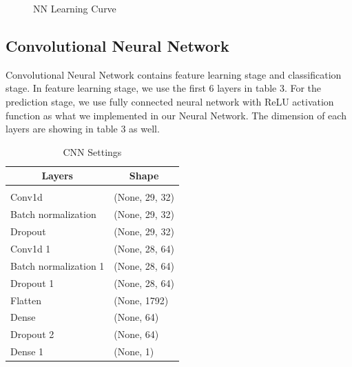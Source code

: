 \documentclass{article} %
\begin{document}
\begin{figure}[H]
\begin{center}
\caption{NN Learning Curve}
\end{center}
\end{figure}


\subsection{Convolutional Neural Network}
Convolutional Neural Network contains feature learning stage and classification stage. In feature learning stage, we use the first 6 layers in table 3. For the prediction stage, we use fully connected neural network with ReLU activation function as what we implemented in our Neural Network. The dimension of each layers are showing in table 3 as well. 

\begin{table}[H]
\caption{CNN Settings}
\begin{center}
\begin{tabular}{ll}
\multicolumn{1}{c}{\bf Layers}  &\multicolumn{1}{c}{\bf Shape}
\\ \hline \\
Conv1d    &(None, 29, 32) \\
Batch normalization  &(None, 29, 32)\\
Dropout   &(None, 29, 32)\\
Conv1d 1  &(None, 28, 64)\\
Batch normalization 1  &(None, 28, 64)\\
Dropout 1 & (None, 28, 64)\\
Flatten   & (None, 1792)\\
Dense   & (None, 64)\\
Dropout 2 & (None, 64)\\
Dense 1   & (None, 1)\\
\end{tabular}
\end{center}
\end{table}
\end{document}
